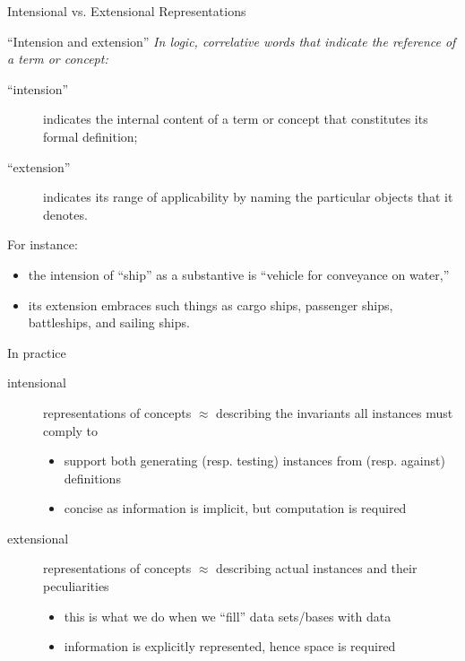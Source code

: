 \documentclass[presentation]{beamer}\mode<presentation>{\usetheme{AMSBolognaFC}}
\begin{document}
\begin{frame}[allowframebreaks]{Intensional vs. Extensional Representations}
    \begin{block}{``Intension and extension'' }\itshape\small
        In logic, correlative words that indicate the reference of a term or concept:
        \begin{description}
            \item[``intension''] indicates the internal content of a term or concept that constitutes its formal definition;
            \item[``extension''] indicates its range of applicability by naming the particular objects that it denotes.
        \end{description}
        For instance:
        \begin{itemize}
            \item the intension of ``ship'' as a substantive is ``vehicle for conveyance on water,''
            \item its extension embraces such things as cargo ships, passenger ships, battleships, and sailing ships.
        \end{itemize}
    \end{block}

    \framebreak

    \begin{block}{In practice}\small
        \begin{description}
            \item[intensional] representations of concepts $\approx$ describing the \alert{invariants} all instances must comply to
            \begin{itemize}
                \item support both \alert{generating} (resp. \alert{testing}) instances from (resp. against) definitions
                \item \alert{concise} as information is \alert{implicit}, but \alert{computation} is required
            \end{itemize}

            \item[extensional] representations of concepts $\approx$ describing \alert{actual} instances and their peculiarities
            \begin{itemize}
                \item this is what we do when we ``fill'' data sets/bases with data
                \item information is \alert{explicitly} represented, hence \alert{space} is required
            \end{itemize}
        \end{description}
    \end{block}


\end{frame}
\end{document}
